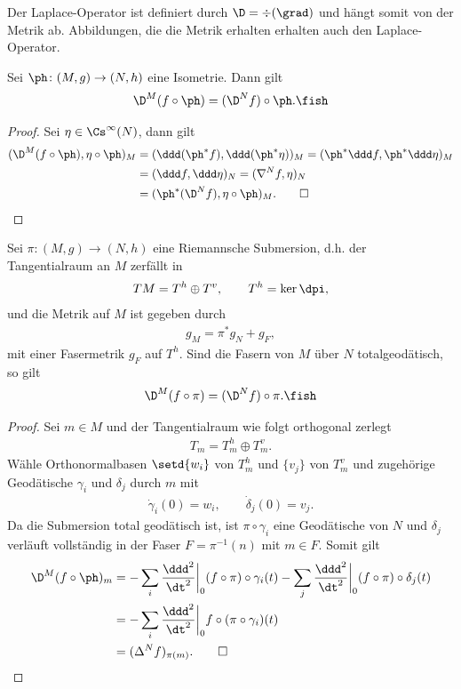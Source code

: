 \documentclass[%
	paper=a5,%
	fleqn,%
	DIV=18,%
	BCOR=0mm,
	fontsize=11pt,
	titlepage=false,%
	bibliography=totoc,
	DIV=18,%
	twoside=true,
	pdftitle=Riemannsche Geometrie,
	pdfauthor=Uwe Semmelmann,
	numbers=noendperiod]%
	{scrbook}
\begin{document}
Der Laplace-Operator ist definiert durch $\D =\div(\grad)$  und hängt somit von der Metrik ab. Abbildungen, die die Metrik erhalten erhalten auch den Laplace-Operator.

\begin{prop}
Sei $\ph\colon (M,g)\to (N,h)$ eine Isometrie. Dann gilt
\begin{align*}
\D^M(f\circ\ph) = (\D^Nf)\circ\ph.\fish
\end{align*}
\end{prop}
\begin{proof}
Sei $\eta\in\Cs^\infty(N)$, dann gilt
\begin{align*}
(\D^M(f\circ\ph),\eta\circ\ph)_{M} &= 
(\ddd(\ph^* f),\ddd(\ph^*\eta))_{M}
=
(\ph^*\ddd f,\ph^*\ddd\eta)_{M}\\
&=
(\ddd f,\ddd\eta)_{N}
=
(\nabla^N f,\eta)_{N}\\
&= 
(\ph^*(\D^N f),\eta\circ\ph)_{M}.\qed
\end{align*} 
\end{proof}

\begin{prop}
Sei $\pi\colon (M,g)\to (N,h)$ eine Riemannsche Submersion, d.h. der Tangentialraum an $M$ zerfällt in
\begin{align*}
TM = T^h\oplus T^v,\qquad T^h= \ker\dpi,
\end{align*}
und die Metrik auf $M$ ist gegeben durch
\begin{align*}
g_{M} = \pi^*g_{N} + g_{F},
\end{align*}
mit einer Fasermetrik $g_{F}$ auf $T^h$. Sind die Fasern von $M$ über $N$ totalgeodätisch, so gilt
\begin{align*}
\D^M(f\circ\pi) = (\D^N f)\circ\pi.\fish
\end{align*}
\end{prop}
\begin{proof}
Sei $m\in M$ und der Tangentialraum wie folgt orthogonal zerlegt
\begin{align*}
T_{m} = T_{m}^h \oplus T_{m}^v.
\end{align*}
Wähle Orthonormalbasen $\setd{w_{i}}$ von $T_{m}^h$ und $\{v_{j}\}$ von $T_{m}^v$ und zugehörige Geodätische $\gamma_{i}$ und $\delta_{j}$ durch $m$ mit
\begin{align*}
\dot\gamma_{i}(0) = w_{i},\qquad \dot\delta_{j}(0) = v_{j}.
\end{align*}
Da die Submersion total geodätisch ist, ist $\pi\circ\gamma_{i}$ eine Geodätische von $N$ und $\delta_{j}$ verläuft vollständig in der Faser $F=\pi^{-1}(n)$ mit $m\in F$. Somit gilt
\begin{align*}
\D^M(f\circ\ph)_{m} &= -\sum_{i}\frac{\ddd^2}{\dt^2}\bigg|_{0} (f\circ\pi)\circ \gamma_{i}(t)
 -\sum_{j}\frac{\ddd^2}{\dt^2}\bigg|_{0} (f\circ\pi)\circ \delta_{j}(t)\\
&  = -\sum_{i}\frac{\ddd^2}{\dt^2}\bigg|_{0} f\circ(\pi\circ \gamma_{i})(t)\\
&  = (\Delta^N f)_{\pi(m)}.\qed
\end{align*}
\end{proof}
\end{document}
